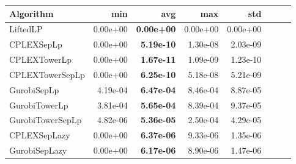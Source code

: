 \begin{tabular}{lrrrrrrr}
Algorithm & min & avg & max & std
\\
\hline
LiftedLP&0.00e+00& \bf0.00e+00& 0.00e+00& 0.00e+00\\
CPLEXSepLp&0.00e+00& \bf5.19e-10& 1.30e-08& 2.03e-09\\
CPLEXTowerLp&0.00e+00& \bf1.67e-11& 1.09e-09& 1.23e-10\\
CPLEXTowerSepLp&0.00e+00& \bf6.25e-10& 5.18e-08& 5.21e-09\\
GurobiSepLp&4.19e-04& \bf6.47e-04& 8.46e-04& 8.87e-05\\
GurobiTowerLp&3.81e-04& \bf5.65e-04& 8.39e-04& 9.37e-05\\
GurobiTowerSepLp&4.82e-06& \bf5.36e-05& 2.50e-04& 4.29e-05\\
CPLEXSepLazy&0.00e+00& \bf6.37e-06& 9.33e-06& 1.35e-06\\
GurobiSepLazy&0.00e+00& \bf6.17e-06& 8.90e-06& 1.47e-06
\end{tabular}
